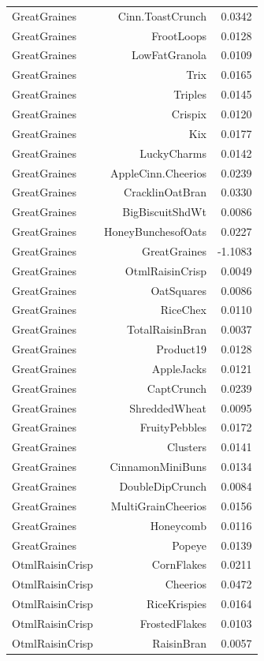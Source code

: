 \begin{longtable}{@{}lrr@{}}
GreatGraines & Cinn.ToastCrunch & 0.0342 \\
GreatGraines & FrootLoops & 0.0128 \\
GreatGraines & LowFatGranola & 0.0109 \\
GreatGraines & Trix & 0.0165 \\
GreatGraines & Triples & 0.0145 \\
GreatGraines & Crispix & 0.0120 \\
GreatGraines & Kix & 0.0177 \\
GreatGraines & LuckyCharms & 0.0142 \\
GreatGraines & AppleCinn.Cheerios & 0.0239 \\
GreatGraines & CracklinOatBran & 0.0330 \\
GreatGraines & BigBiscuitShdWt & 0.0086 \\
GreatGraines & HoneyBunchesofOats & 0.0227 \\
GreatGraines & GreatGraines & -1.1083 \\
GreatGraines & OtmlRaisinCrisp & 0.0049 \\
GreatGraines & OatSquares & 0.0086 \\
GreatGraines & RiceChex & 0.0110 \\
GreatGraines & TotalRaisinBran & 0.0037 \\
GreatGraines & Product19 & 0.0128 \\
GreatGraines & AppleJacks & 0.0121 \\
GreatGraines & CaptCrunch & 0.0239 \\
GreatGraines & ShreddedWheat & 0.0095 \\
GreatGraines & FruityPebbles & 0.0172 \\
GreatGraines & Clusters & 0.0141 \\
GreatGraines & CinnamonMiniBuns & 0.0134 \\
GreatGraines & DoubleDipCrunch & 0.0084 \\
GreatGraines & MultiGrainCheerios & 0.0156 \\
GreatGraines & Honeycomb & 0.0116 \\
GreatGraines & Popeye & 0.0139 \\
OtmlRaisinCrisp & CornFlakes & 0.0211 \\
OtmlRaisinCrisp & Cheerios & 0.0472 \\
OtmlRaisinCrisp & RiceKrispies & 0.0164 \\
OtmlRaisinCrisp & FrostedFlakes & 0.0103 \\
OtmlRaisinCrisp & RaisinBran & 0.0057 \\

\end{longtable}
